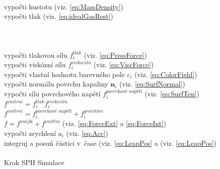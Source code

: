 \begin{center}
	\begin{czechalgorithm}[H] \label{alg:SPH}
			 {\\
				vypočti hustotu (viz. \ref{eq:MassDensity})\\
				vypočti tlak (viz. \ref{eq:idealGasRest})\\
			}\\
			\\
			 {\\
				vypočti tlakovou sílu $f^{tlak}_i$ (viz. \ref{eq:PressForce})\\
				vypočti viskózní sílu $f^{viskozita}_i$ (viz. \ref{eq:ViscForce})\\
				vypočti vlastní hodnotu barevného pole $c_i$ (viz. \ref{eq:ColorField})\\
				vypočti normálu povrchu kapaliny $\mathbf{n}_i$ (viz. \ref{eq:SurfNormal})\\
				vypočti sílu povrchového napětí $f^{\textit{povrchové napětí}}_i$ (viz. \ref{eq:SurfTen})\\
				$f^{vnitrni} = f^{tlak}_i f^{viskozita}_i$ \\
				$f^{vnitrni} = f^{\textit{povrchové napětí}}_i + f^{gravitace}_i$\\
				$f = f^{\textit{vnější}} + f^{\textit{vnitřní}}$ (viz. \ref{eq:ForceExt} a \ref{eq:ForceInt})\\
				vypočti zrychlení $a_i$ (viz. \ref{eq:Acc})\\
				integruj a posuň částici v~čase (viz. \ref{eq:LeapPos} a (viz. \ref{eq:LeapPos})\\
			}\\

		\caption{Krok SPH Simulace}
	\end{czechalgorithm}
\end{center}

